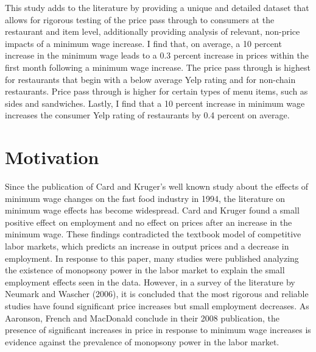\documentclass[11pt]{article}
\begin{document}
This study adds to the literature by providing a unique and detailed dataset that allows for rigorous testing of the price pass through to consumers at the restaurant and item level, additionally providing analysis of relevant, non-price impacts of a minimum wage increase. I find that, on average, a 10 percent increase in the minimum wage leads to a 0.3 percent increase in prices within the first month following a minimum wage increase. The price pass through is highest for restaurants that begin with a below average Yelp rating and for non-chain restaurants. Price pass through is higher for certain types of menu items, such as sides and sandwiches. Lastly, I find that a 10 percent increase in minimum wage increases the consumer Yelp rating of restaurants by 0.4 percent on average.

\section{Motivation}

Since the publication of Card and Kruger's well known study about the effects of minimum wage changes on the fast food industry in 1994\nocite{card1994minimum}, the literature on minimum wage effects has become widespread. Card and Kruger found a small positive effect on employment and no effect on prices after an increase in the minimum wage. These findings contradicted the textbook model of competitive labor markets, which predicts an increase in output prices and a decrease in employment. In response to this paper, many studies were published analyzing the existence of monopsony power in the labor market \cite{manning1995we, rebitzer1995consequences, burdett1998wage, bhaskar1999minimum} to explain the small employment effects seen in the data. However, in a survey of the literature by Neumark and Wascher (2006)\nocite{neumark2006minimum'}, it is concluded that the most rigorous and reliable studies have found significant price increases but small employment decreases. As Aaronson, French and MacDonald conclude in their 2008 publication\nocite{aaronson2008minimum}, the presence of significant increases in price in response to minimum wage increases is evidence against the prevalence of monopsony power in the labor market. 
\end{document}
